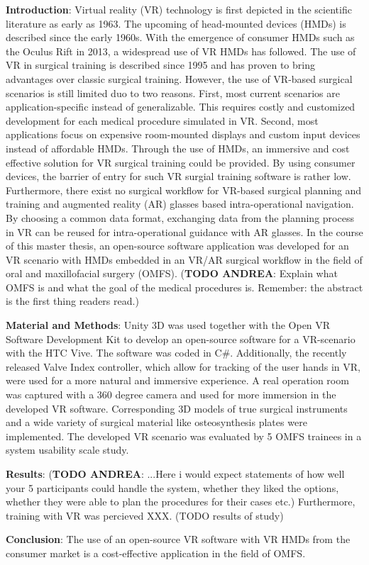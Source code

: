 \textbf{Introduction}: Virtual reality (VR) technology is first depicted in the scientific literature as early as 1963.
The upcoming of head-mounted devices (HMDs) is described since the early 1960s.
With the emergence of consumer HMDs such as the Oculus Rift in 2013, a widespread use of VR HMDs has followed.
The use of VR in surgical training is described since 1995 and has proven to bring advantages over classic surgical training.
However, the use of VR-based surgical scenarios is still limited duo to two reasons.
First, most current scenarios are application-specific instead of generalizable.
This requires costly and customized development for each medical procedure simulated in VR.
Second, most applications focus on expensive room-mounted displays and custom input devices instead of affordable HMDs.
Through the use of HMDs, an immersive and cost effective solution for VR surgical training could be provided.
By using consumer devices, the barrier of entry for such VR surgial training software is rather low.
Furthermore, there exist no surgical workflow for VR-based surgical planning and training and augmented reality (AR) glasses based intra-operational navigation.
By choosing a common data format, exchanging data from the planning process in VR can be reused for intra-operational guidance with AR glasses.
In the course of this master thesis, an open-source software application was developed for an VR scenario with HMDs embedded in an VR/AR surgical workflow in the field of oral and maxillofacial surgery (OMFS). 
(\textbf{TODO ANDREA}: Explain what OMFS is and what the goal of the medical procedures is. Remember: the abstract is the first thing readers read.)


\textbf{Material and Methods}: Unity 3D was used together with the Open VR Software Development Kit to develop an open-source software for a VR-scenario with the HTC Vive.
The software was coded in C\#. 
Additionally, the recently released Valve Index controller, which allow for tracking of the user hands in VR, were used for a more natural and immersive experience.
A real operation room was captured with a 360 degree camera and used for more immersion in the developed VR software.
Corresponding 3D models of true surgical instruments and a wide variety of surgical material like osteosynthesis plates were implemented.
The developed VR scenario was evaluated by 5 OMFS trainees in a system usability scale study.

\textbf{Results}: (\textbf{TODO ANDREA}: ...Here i would expect statements of how well your 5 participants could handle the system, whether they liked the options, whether they were able to plan the procedures for their cases etc.)
Furthermore, training with VR was percieved XXX. (TODO results of study)

\textbf{Conclusion}: The use of an open-source VR software with VR HMDs from the consumer market is a cost-effective application in the field of OMFS.
